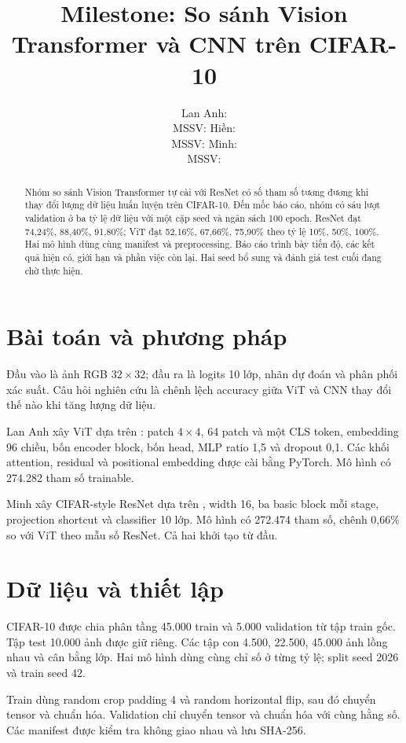 \documentclass[11pt,a4paper]{article}
\title{Milestone: So sánh Vision Transformer và CNN trên CIFAR-10}
\author{Lan Anh: \underline{\hspace{1cm}} \\ MSSV: \underline{\hspace{1.6cm}}
\And Hiền: \underline{\hspace{1cm}} \\ MSSV: \underline{\hspace{1.6cm}}
\And Minh: \underline{\hspace{1cm}} \\ MSSV: \underline{\hspace{1.6cm}}}
\begin{document}
\maketitle
\begin{abstract}
Nhóm so sánh Vision Transformer tự cài với ResNet có số tham số tương đương khi thay đổi lượng dữ liệu huấn luyện trên CIFAR-10. Đến mốc báo cáo, nhóm có sáu lượt validation ở ba tỷ lệ dữ liệu với một cặp seed và ngân sách 100 epoch. ResNet đạt 74,24\%, 88,40\%, 91,80\%; ViT đạt 52,16\%, 67,66\%, 75,90\% theo tỷ lệ 10\%, 50\%, 100\%. Hai mô hình dùng cùng manifest và preprocessing. Báo cáo trình bày tiến độ, các kết quả hiện có, giới hạn và phần việc còn lại. Hai seed bổ sung và đánh giá test cuối đang chờ thực hiện.
\end{abstract}

\section{Bài toán và phương pháp}
Đầu vào là ảnh RGB $32\times32$; đầu ra là logits 10 lớp, nhãn dự đoán và phân phối xác suất. Câu hỏi nghiên cứu là chênh lệch accuracy giữa ViT và CNN thay đổi thế nào khi tăng lượng dữ liệu.

Lan Anh xây ViT dựa trên \citet{dosovitskiy2020image}: patch $4\times4$, 64 patch và một CLS token, embedding 96 chiều, bốn encoder block, bốn head, MLP ratio 1,5 và dropout 0,1. Các khối attention, residual và positional embedding được cài bằng PyTorch. Mô hình có 274.282 tham số trainable.

Minh xây CIFAR-style ResNet dựa trên \citet{he2015deep}, width 16, ba basic block mỗi stage, projection shortcut và classifier 10 lớp. Mô hình có 272.474 tham số, chênh 0,66\% so với ViT theo mẫu số ResNet. Cả hai khởi tạo từ đầu.

\section{Dữ liệu và thiết lập}
CIFAR-10 \citep{krizhevsky2009learning} được chia phân tầng 45.000 train và 5.000 validation từ tập train gốc. Tập test 10.000 ảnh được giữ riêng. Các tập con 4.500, 22.500, 45.000 ảnh lồng nhau và cân bằng lớp. Hai mô hình dùng cùng chỉ số ở từng tỷ lệ; split seed 2026 và train seed 42.

Train dùng random crop padding 4 và random horizontal flip, sau đó chuyển tensor và chuẩn hóa. Validation chỉ chuyển tensor và chuẩn hóa với cùng hằng số. Các manifest được kiểm tra không giao nhau và lưu SHA-256.
\end{document}
